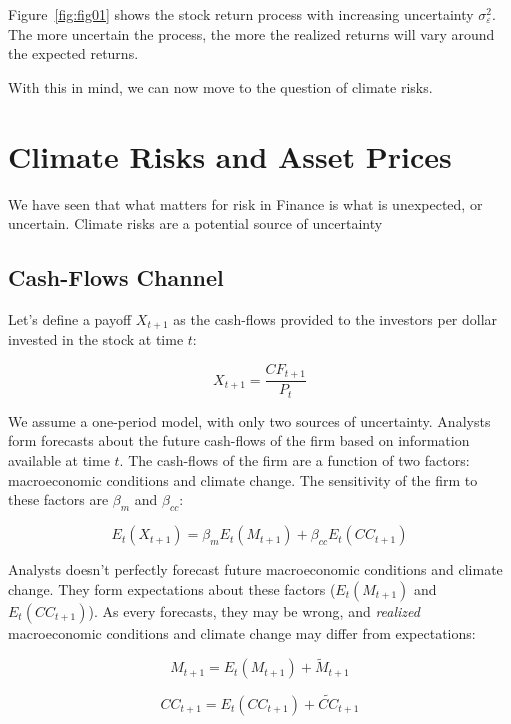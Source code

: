 Figure~\ref{fig:fig01} shows the stock return process
with increasing uncertainty $\sigma_{\varepsilon}^2$.
The more uncertain the process, the more
the realized returns will vary around the
expected returns. 

With this in mind, we can now move to the question 
of climate risks. 

\section{Climate Risks and Asset Prices}

We have seen that what matters for risk 
in Finance is what is unexpected, or uncertain.
Climate risks are a potential source of uncertainty 

\subsection{Cash-Flows Channel}

Let's define a payoff $X_{t+1}$ as the 
cash-flows provided to the investors per dollar invested in the stock at time $t$:

\begin{equation}
    X_{t+1} = \frac{CF_{t+1}}{P_t}
\end{equation}

We assume a one-period model, with only 
two sources of uncertainty. 
Analysts form forecasts 
about the future cash-flows of the firm
based on information available at time $t$.
The cash-flows of the firm are a function of
two factors: macroeconomic conditions and climate change.
The sensitivity of the firm to these factors are $\beta_m$ and $\beta_{cc}$:

\begin{equation}
    E_t(X_{t+1}) = \beta_m E_t(M_{t+1})
    + \beta_{cc} E_t(CC_{t+1})
\end{equation}

Analysts doesn't perfectly forecast future macroeconomic conditions
and climate change. They form expectations about these factors 
($E_t(M_{t+1})$ and $E_t(CC_{t+1})$).
As every forecasts, they may be wrong, 
and \textit{realized} macroeconomic conditions and climate change
may differ from expectations:

\begin{equation}
    M_{t+1} = E_t(M_{t+1}) + \tilde{M}_{t+1}
\end{equation}

\begin{equation}
    CC_{t+1} = E_t(CC_{t+1}) + \tilde{CC}_{t+1}
\end{equation}

